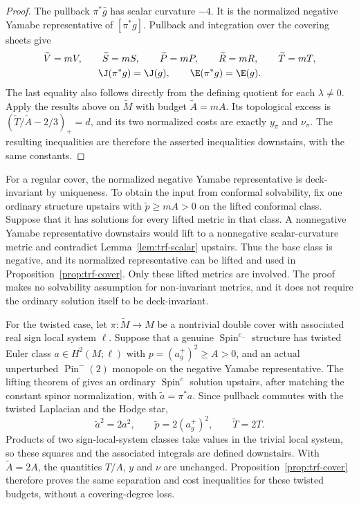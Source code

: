 \begin{proof}
The pullback $\pi^*\widehat g$ has scalar curvature $-4$.  It is the
normalized negative Yamabe representative of $[\pi^*g]$.  Pullback
and integration over the covering sheets give
\begin{gather*}
 \widetilde V=mV,\qquad
 \widetilde S=mS,\qquad
 \widetilde P=mP,\qquad
 \widetilde R=mR,\qquad
 \widetilde T=mT,\\
 \J(\pi^*g)=\J(g),\qquad \E(\pi^*g)=\E(g).
\end{gather*}
The last equality also follows directly from the defining quotient for
each $\lambda\ne0$.  Apply the results above on $\widetilde M$ with
budget $\widetilde A=mA$.  Its topological excess is
$(\widetilde T/\widetilde A-2/3)_+=d$, and its two normalized costs
are exactly $y_\pi$ and $\nu_\pi$.  The resulting inequalities are
therefore the asserted inequalities downstairs, with the same constants.
\end{proof}

For a regular cover, the normalized negative Yamabe representative is
deck-invariant by uniqueness.  To obtain the input from conformal
solvability, fix one ordinary structure upstairs with
$\widetilde p\ge mA>0$ on the lifted conformal class.  Suppose that it
has solutions for every lifted metric in that class.  A nonnegative
Yamabe representative downstairs would lift to a nonnegative
scalar-curvature metric and contradict Lemma~\ref{lem:trf-scalar}
upstairs.  Thus the base class is negative, and its normalized
representative can be lifted and used in Proposition~\ref{prop:trf-cover}.
Only these lifted metrics are involved.  The proof makes no solvability
assumption for non-invariant metrics, and it does not require the
ordinary solution itself to be deck-invariant.

For the twisted case, let $\pi:\widetilde M\to M$ be a nontrivial
double cover with associated real sign local system $\ell$.  Suppose
that a genuine $\operatorname{Spin}^{c_-}$ structure has twisted Euler
class $a\in H^2(M;\ell)$ with $p=(a_g^+)^2\ge A>0$, and an actual unperturbed
$\operatorname{Pin}^-(2)$ monopole on the negative Yamabe
representative.  The lifting theorem of \cite{IMN2016} gives an
ordinary $\operatorname{Spin}^c$ solution upstairs, after matching the
constant spinor normalization, with $\widetilde a=\pi^*a$.
Since pullback commutes with the twisted Laplacian and the Hodge star,
\begin{equation}
 \widetilde a^2=2a^2,
 \qquad \widetilde p=2(a_g^+)^2,
 \qquad \widetilde T=2T.
 \label{eq:trf-pin-scaling}
\end{equation}
Products of two sign-local-system classes take values in the trivial
local system, so these squares and the associated integrals are defined
downstairs.  With $\widetilde A=2A$, the quantities $T/A$, $y$ and
$\nu$ are unchanged.  Proposition~\ref{prop:trf-cover} therefore
proves the same separation and cost inequalities for these twisted
budgets, without a covering-degree loss.

